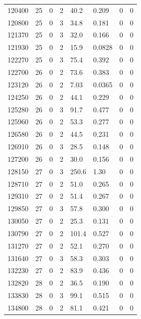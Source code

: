 \documentclass[preview]{standalone}
\begin{document}
{{{{{{{{{{{\begin{tabular}{L{1.2cm}C{1.2cm} C{0.3cm}C{0.5cm} C{1.4cm}C{1.4cm} C{1.4cm}C{1.4cm}}
  120400  &    25  & 0     &  2 &  40.2  & 0.209  & 0 &  0   \\ 
  120800  &    25  & 0     &  3 &  34.8  & 0.181  & 0 &  0   \\ 
  121370  &    25  & 0     &  3 &  32.0  & 0.166  & 0 &  0   \\ 
  121930  &    25  & 0     &  2 &  15.9  & 0.0828  & 0 &  0   \\ 
  122270  &    25  & 0     &  3 &  75.4  & 0.392  & 0 &  0   \\ 
  122700  &    26  & 0     &  2 &  73.6  & 0.383  & 0 &  0   \\ 
  123120  &    26  & 0     &  2 &  7.03  & 0.0365  & 0 &  0   \\ 
  124250  &    26  & 0     &  2 &  44.1  & 0.229  & 0 &  0   \\ 
  125280  &    26  & 0     &  3 &  91.7  & 0.477  & 0 &  0   \\ 
  125960  &    26  & 0     &  2 &  53.3  & 0.277  & 0 &  0   \\ 
  126580  &    26  & 0     &  2 &  44.5  & 0.231  & 0 &  0   \\ 
  126910  &    26  & 0     &  3 &  28.5  & 0.148  & 0 &  0   \\ 
  127200  &    26  & 0     &  2 &  30.0  & 0.156  & 0 &  0   \\ 
  128150  &    27  & 0     &  3 &  250.6  & 1.30  & 0 &  0   \\ 
  128710  &    27  & 0     &  2 &  51.0  & 0.265  & 0 &  0   \\ 
  129310  &    27  & 0     &  2 &  51.4  & 0.267  & 0 &  0   \\ 
  129850  &    27  & 0     &  3 &  57.8  & 0.300  & 0 &  0   \\ 
  130050  &    27  & 0     &  2 &  25.3  & 0.131  & 0 &  0   \\ 
  130790  &    27  & 0     &  2 &  101.4  & 0.527  & 0 &  0   \\ 
  131270  &    27  & 0     &  2 &  52.1  & 0.270  & 0 &  0   \\ 
  131640  &    27  & 0     &  3 &  58.3  & 0.303  & 0 &  0   \\ 
  132230  &    27  & 0     &  2 &  83.9  & 0.436  & 0 &  0   \\ 
  132820  &    28  & 0     &  2 &  36.5  & 0.190  & 0 &  0   \\ 
  133830  &    28  & 0     &  3 &  99.1  & 0.515  & 0 &  0   \\ 
  134800  &    28  & 0     &  2 &  81.1  & 0.421  & 0 &  0   \\ 
\hline 
\end{tabular} 

}}}}}}}}}}}
\end{document}
